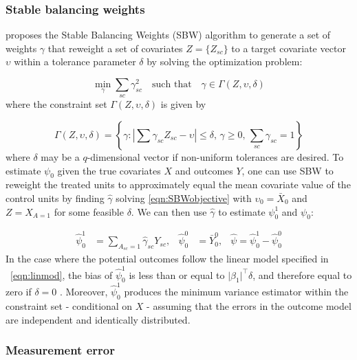 \documentclass[aoas]{imsart}
\theoremstyle{plain}
\theoremstyle{remark}
\begin{document}
\subsubsection{Stable balancing weights}\label{ssec:SBW}

\cite{zubizarreta2015stable} proposes the Stable Balancing Weights (SBW) algorithm to generate a set of weights $\gamma$ that reweight a set of covariates $Z = \{Z_{sc}\}$ to a target covariate vector $\upsilon$ within a tolerance parameter $\delta$ by solving the optimization problem:

\begin{equation}\label{eqn:SBWobjective}
 \min_{\gamma} \sum_{sc} \gamma_{sc}^2 \quad \text{such that} \quad \gamma \in \Gamma(Z, \upsilon, \delta)
\end{equation}
%
where the constraint set $\Gamma(Z, \upsilon, \delta)$ is given by

\[ \Gamma(Z, \upsilon, \delta) = \left\{\gamma: \left|\sum \gamma_{sc} Z_{sc}  - \upsilon\right| \leq \delta,\, \gamma \geq 0,\, \sum_{sc} \gamma_{sc} = 1\right\}\]
%
where $\delta$ may be a $q$-dimensional vector if non-uniform tolerances are desired. To estimate $\psi_0$ given the true covariates $X$ and outcomes $Y$, one can use SBW to reweight the treated units to approximately equal the mean covariate value of the control units by finding $\hat{\gamma}$ solving \eqref{eqn:SBWobjective} with $\upsilon_0 = \bar{X}_0$ and $Z = X_{A=1}$ for some feasible $\delta$. We can then use $\hat{\gamma}$ to estimate $\psi_0^1$ and $\psi_0$:

\begin{align}\label{eqn:estimators}
\hat{\psi}_0^1 &= \sum_{A_{sc}=1} \hat{\gamma}_{sc} Y_{sc}, & \hat{\psi}_0^0 & = \bar{Y}_0^0, & \hat{\psi} = \hat{\psi}_0^1 - \hat{\psi}_0^0
\end{align}
%
In the case where the potential outcomes follow the linear model specified in ~\eqref{eqn:linmod}, the bias of $\hat{\psi}^1_0$ is less than or equal to $\lvert\beta_1\rvert^\top\delta$, and therefore equal to zero if $\delta = 0$ \citep{zubizarreta2015stable}. Moreover, $\hat{\psi}_0^1$ produces the minimum variance estimator within the constraint set - conditional on $X$ - assuming that the errors in the outcome model are independent and identically distributed.

\subsubsection{Measurement error}\label{ssec:methodsmsrment} 
\end{document}
